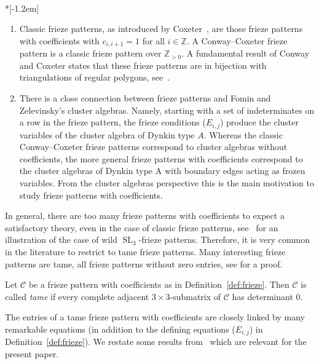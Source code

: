 \documentclass[ALCO,ThmDefs,Unicode,epreuves,published]{cedram}
\numberwithin{equation}{section}
\DeclareMathOperator{\SL}{SL}
\begin{document}
\begin{rema}\ \\*[-1.2em]
\begin{enumerate}
 \item Classic frieze patterns, as introduced by Coxeter~\cite{Cox71}, 
are those frieze patterns with coefficients with $c_{i,i+1}=1$ for all $i\in \mathbb{Z}$.
A Conway--Coxeter frieze pattern is a classic frieze pattern over $\mathbb{Z}_{> 0}$. 
A fundamental result of Conway and Coxeter states that these frieze patterns are in bijection with triangulations of regular polygons, see~\cite{CC73}. 
\item There is a close connection between frieze patterns and Fomin and
Zelevinsky's cluster algebras. Namely, 
starting with a set of indeterminates on a row in the frieze pattern,
the frieze conditions ($E_{i,j}$) produce the cluster variables of the
cluster algebra of Dynkin type $A$. Whereas the classic Conway--Coxeter frieze
patterns correspond to cluster algebras without coefficients, the more general
frieze patterns with coefficients correspond to the cluster algebras of 
Dynkin type A with boundary edges acting as frozen variables.
From the cluster algebras perspective this is the main motivation to study 
frieze patterns with coefficients.
\end{enumerate}
\end{rema}


In general, there are too many frieze patterns
with coefficients to expect a satisfactory theory, even in the case of classic frieze 
patterns,
see~\cite[Section~3]{Cuntz-wild} for an illustration of the case of wild $\SL_3$-frieze patterns. Therefore, it is very common in the literature to
restrict to tame frieze patterns. Many interesting frieze patterns 
are tame, \eg all frieze patterns without zero entries, see 
\cite[Proposition~2.4]{CHJ} for a proof. 


\begin{defi} \label{def:tame}
Let $\mathcal{C}$ be a frieze pattern with coefficients as in Definition~\ref{def:frieze}.
Then $\mathcal{C}$ is called {\em tame} if every complete adjacent $3\times 3$-submatrix of 
$\mathcal{C}$ has determinant 0.
\end{defi}


The entries of a tame frieze pattern with coefficients are closely linked
by many remarkable equations (in addition to the defining equations ($E_{i,j}$)
in Definition~\ref{def:frieze}). We restate some results from~\cite{CHJ}
which are relevant for the present paper.
\end{document}
